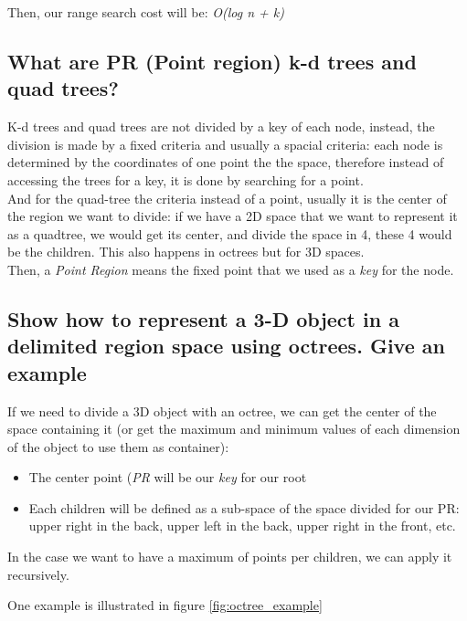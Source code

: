 \documentclass{article}
\begin{document}
Then, our range search cost will be: \textit{O(log n + k)} \citep{fractional_cascading1}\citep{fractional_cascading2}

\subsection{What are PR (Point region) k-d trees and quad trees?}

K-d trees and quad trees are not divided by a key of each node, instead, the division is made by a fixed criteria and usually a spacial criteria: each node is determined by the coordinates of one point the the space, therefore instead of accessing the trees for a key, it is done by searching for a point.\\
And for the quad-tree the criteria instead of a point, usually it is the center of the region we want to divide: if we have a 2D space that we want to represent it as a quadtree, we would get its center, and divide the space in 4, these 4 would be the children. This also happens in octrees but for 3D spaces.\\

Then, a \textit{Point Region} means the fixed point that we used as a \textit{key} for the node.



\subsection{Show how to represent a 3-D object in a delimited region space using
octrees. Give an example}

If we need to divide a 3D object with an octree, we can get the center of the space containing it (or get the maximum and minimum values of each dimension of the object to use them as container):

\begin{itemize}
    \item The center point (\textit{PR} will be our \textit{key} for our root
    \item Each children will be defined as a sub-space of the space divided for our PR: upper right in the back, upper left in the back, upper right in the front, etc.
\end{itemize}

In the case we want to have a maximum of points per children, we can apply it recursively.

One example is illustrated in figure \ref{fig:octree_example}
\end{document}
